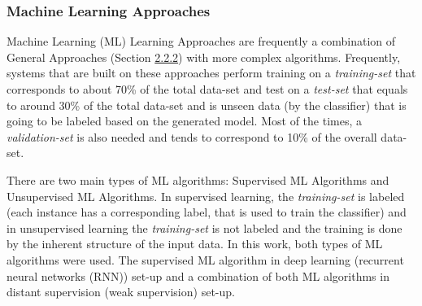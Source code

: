 \documentclass[11pt]{article}
\begin{document}

\hypertarget{7}{\subsubsection{Machine Learning Approaches}}


Machine Learning (ML) Learning Approaches are frequently a combination of General Approaches (Section \hyperlink{6}{2.2.2}) with more complex algorithms. Frequently, systems that are built on these approaches perform training on a \textit{training-set} that corresponds to about 70\% of the total data-set and test on a \textit{test-set} that equals to around 30\% of the total data-set and is unseen data (by the classifier) that is going to be labeled based on the generated model. Most of the times, a \textit{validation-set} is also needed and tends to correspond to 10\% of the overall data-set. 

There are two main types of ML algorithms: Supervised ML Algorithms and Unsupervised ML Algorithms. In supervised learning, the \textit{training-set} is labeled (each instance has a corresponding label, that is used to train the classifier) and in unsupervised learning the \textit{training-set} is not labeled and the training is done by the inherent structure of the input data. In this work, both types of ML algorithms were used. The supervised ML algorithm in deep learning (recurrent neural networks (RNN)) set-up and a combination of both ML algorithms in distant supervision (weak supervision) set-up.
\end{document}
